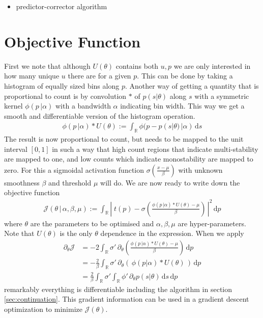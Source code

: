 \documentclass{article}[12pt]
\numberwithin{equation}{section}
\begin{document}
\begin{itemize}
    \item predictor-corrector algorithm
    \end{itemize}

\section{Objective Function}
\label{sec:objective-function}

First we note that although $U(\theta)$ contains both $u,p$ we
are only interested in how many unique $u$ there are for a given $p$.
This can be done by taking a histogram of equally sized bins along $p$.
Another way of getting a quantity that is proportional to count is
by convolution $*$ of $p(s|\theta)$ along $s$ with a symmetric kernel
$\phi(p\,|\alpha)$ with a bandwidth $\alpha$ indicating bin width.
This way we get a smooth and differentiable version of the histogram
operation.
\begin{align}
    \phi(p\,|\alpha)*U(\theta):=
    \int_{\mathbb{R}}\!\phi(p-p(s|\theta)\,|\alpha)\,\mathrm{d}s
\end{align}
The result is now proportional to count, but needs to
be mapped to the unit interval $[0,1]$ in such a way that high
count regions that indicate multi-stability are mapped to one, and
low counts which indicate monostability are mapped to zero. For
this a sigmoidal activation function $\sigma(\frac{x-\mu}{\beta})$ with
unknown smoothness $\beta$ and threshold $\mu$ will do. We
are now ready to write down the objective function
\begin{align}
	\mathcal{J}(\theta\,|\,\alpha,\beta,\mu):=                            
	\int_{\mathbb{R}}\left|\;                                                  
    t(p) - \sigma\left(\frac{\phi(p\,|\alpha)*U(\theta)-\mu}{\beta}\right)
	\,\right|^2\,\mathrm{d}p
\end{align}
where $\theta$ are the parameters to be optimised and $\alpha,\beta,\mu$
are hyper-parameters. Note that $U(\theta)$ is the only $\theta$ dependence
in the expression. When we apply
\begin{align}
    \partial_\theta\mathcal{J}
    &=-2\int_{\mathbb{R}}
    \sigma'\,\partial_\theta\left(
        \frac{\phi(p\,|\alpha)*U(\theta)-\mu}{\beta}
        \right)
    \,\mathrm{d}p\\
    &=-\frac{2}{\beta}\int_{\mathbb{R}}
    \sigma'\,
        \partial_\theta(\,\phi(p|\alpha)*U(\theta)\,)
    \,\mathrm{d}p\\
    &=\frac{2}{\beta}
    \int_{\mathbb{R}}\sigma'\!\! \int_{\mathbb{R}}\phi'\,
        \partial_\theta p(s|\theta)
    \,\mathrm{d}s \,\mathrm{d}p
\end{align}
remarkably everything is differentiable including the algorithm in section
\ref{sec:continuation}. This gradient information can be used in a
gradient descent optimization to minimize $\mathcal{J}(\theta)$.
\end{document}
